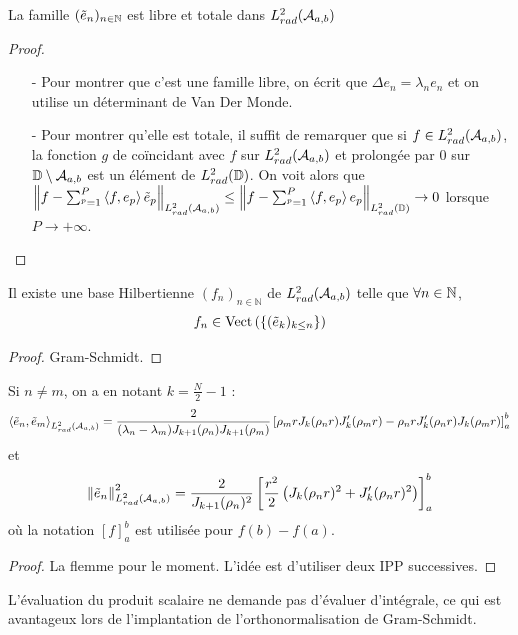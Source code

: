 \documentclass[11pt,a4paper]{article}
\begin{document}
\begin{Prop} La famille $(\tilde{e}_n)_{n\in\mathbb{N}}$ est libre et totale dans $L^2_{rad}(\mathcal{A}_{a,b})$
\begin{proof}\text{ }
\begin{itemize}
\item[-] Pour montrer que c'est une famille libre, on écrit que $\Delta e_n = \lambda_n e_n$ et on utilise un déterminant de Van Der Monde. 
\item[-] Pour montrer qu'elle est totale, il suffit de remarquer que si $f\in L^2_{rad}(\mathcal{A}_{a,b})$, la fonction $g$ de coïncidant avec $f$ sur $L^2_{rad}(\mathcal{A}_{a,b})$ et prolongée par $0$ sur $\mathbb{D} \setminus \mathcal{A}_{a,b}$ est un élément de $L^2_{rad}(\mathbb{D})$. On voit alors que $\left\|f - \sum_{^p=1}^P \left\langle f,e_p\right\rangle\tilde{e}_p\right\|_{L^2_{rad}(\mathcal{A}_{a,b})} \leq \left\|f - \sum_{^p=1}^P \left\langle f,e_p\right\rangle e_p\right\|_{L^2_{rad}(\mathbb{D})} \to 0$ lorsque $P \to +\infty$. 
\end{itemize}
\end{proof}
\end{Prop}

\begin{Prop} Il existe une base Hilbertienne $(f_n)_{n \in \mathbb{N}}$ de $L^2_{rad}(\mathcal{A}_{a,b})$ telle que $\forall n \in \mathbb{N}$, \[f_n \in \textup{Vect}\left(\{(\tilde{e}_k)_{k \leq n} \}\right)\]
\begin{proof} Gram-Schmidt.
\end{proof}
\end{Prop}


\begin{Prop} Si $n \neq m$, on a en notant $k = \frac{N}{2}-1$ : \[ \left\langle \tilde{e}_n,\tilde{e}_m\right\rangle_{L^2_{rad}(\mathcal{A}_{a,b})} =\frac{2} {(\lambda_n - \lambda_m)J_{k+1}(\rho_n)J_{k+1}(\rho_m)}\left[ \rho_m r J_k(\rho_n r)J_k'(\rho_m r)- \rho_n r J_k'(\rho_n r )J_k(\rho_m r)\right]^b_a\] 
et \[ \left\|\tilde{e}_n\right\|^2_{L^2_{rad}(\mathcal{A}_{a,b})} =  \frac{2} {J_{k+1}(\rho_n)^2}\left[ \frac{r^2}{2}\left(J_k(\rho_n r)^2 + J_{k}'(\rho_n r)^2\right)\right]_a^b\]
où la notation $[f]_a^b$ est utilisée pour $f(b) - f(a)$.
\begin{proof}
La flemme pour le moment. L'idée est d'utiliser deux IPP successives. 
\end{proof}
\end{Prop}

\begin{Rem} L'évaluation du produit scalaire ne demande pas d'évaluer d'intégrale, ce qui est avantageux lors de l'implantation de l'orthonormalisation de Gram-Schmidt. 
\end{Rem}




 
\end{document}

